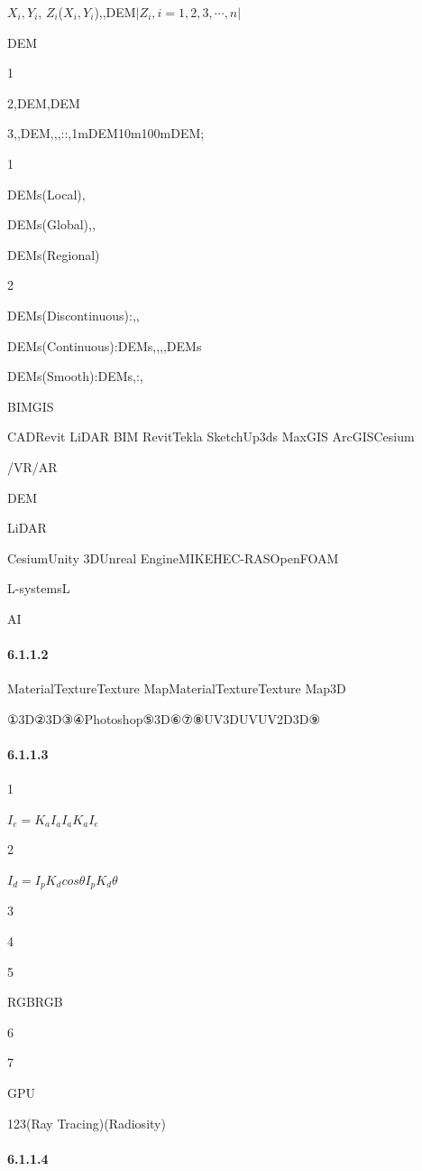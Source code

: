 \(X_i,Y_i\), \(Z_i\)(\(X_i,Y_i\)),,DEM\(|Z_i,i=1,2,3,\cdots,n|\)

DEM

1

2,DEM,DEM

3,,DEM,,,::,1mDEM10m100mDEM;

1

DEMs(Local),

DEMs(Global),,

DEMs(Regional)

2

DEMs(Discontinuous):,,

DEMs(Continuous):DEMs,,,,DEMs

DEMs(Smooth):DEMs,:,

BIMGIS

CADRevit LiDAR BIM RevitTekla SketchUp3ds MaxGIS ArcGISCesium

/VR/AR

DEM

LiDAR

CesiumUnity 3DUnreal EngineMIKEHEC-RASOpenFOAM

L-systemsL

AI

\hypertarget{section-18}{%
\paragraph{6.1.1.2}\label{section-18}}

MaterialTextureTexture MapMaterialTextureTexture Map3D

①3D②3D③④Photoshop⑤3D⑥⑦⑧UV3DUVUV2D3D⑨

\hypertarget{section-19}{%
\paragraph{6.1.1.3}\label{section-19}}

1

\(I_e=K_aI_a\)\(I_a\)\(K_a\)\(I_e\)

2

\(I_d=I_pK_d cos \theta\)\(I_p\)\(K_d\)\(\theta\)

3

4

5

RGBRGB

6

7

GPU

123(Ray Tracing)(Radiosity)

\hypertarget{section-20}{%
\paragraph{6.1.1.4}\label{section-20}}

